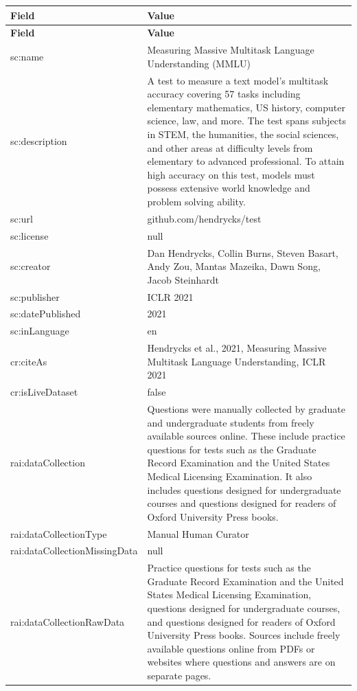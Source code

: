 \documentclass[10pt,a4paper]{article}
\begin{document}
\begin{longtable}{|p{4cm}|p{12cm}|}
\hline
\textbf{Field} & \textbf{Value} \\
\hline
\endfirsthead
\hline
\textbf{Field} & \textbf{Value} \\
\hline
\endhead
\hline
\endfoot

sc:name & Measuring Massive Multitask Language Understanding (MMLU) \\
\hline
sc:description & A test to measure a text model's multitask accuracy covering 57 tasks including elementary mathematics, US history, computer science, law, and more. The test spans subjects in STEM, the humanities, the social sciences, and other areas at difficulty levels from elementary to advanced professional. To attain high accuracy on this test, models must possess extensive world knowledge and problem solving ability. \\
\hline
sc:url & github.com/hendrycks/test \\
\hline
sc:license & null \\
\hline
sc:creator & Dan Hendrycks, Collin Burns, Steven Basart, Andy Zou, Mantas Mazeika, Dawn Song, Jacob Steinhardt \\
\hline
sc:publisher & ICLR 2021 \\
\hline
sc:datePublished & 2021 \\
\hline
sc:inLanguage & en \\
\hline
cr:citeAs & Hendrycks et al., 2021, Measuring Massive Multitask Language Understanding, ICLR 2021 \\
\hline
cr:isLiveDataset & false \\
\hline
rai:dataCollection & Questions were manually collected by graduate and undergraduate students from freely available sources online. These include practice questions for tests such as the Graduate Record Examination and the United States Medical Licensing Examination. It also includes questions designed for undergraduate courses and questions designed for readers of Oxford University Press books. \\
\hline
rai:dataCollectionType & Manual Human Curator \\
\hline
rai:dataCollectionMissingData & null \\
\hline
rai:dataCollectionRawData & Practice questions for tests such as the Graduate Record Examination and the United States Medical Licensing Examination, questions designed for undergraduate courses, and questions designed for readers of Oxford University Press books. Sources include freely available questions online from PDFs or websites where questions and answers are on separate pages. \\

\end{longtable}
\end{document}
